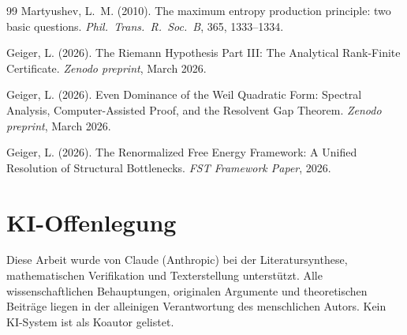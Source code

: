 \documentclass[12pt,a4paper]{article}
\theoremstyle{remark}
\begin{document}
\begin{thebibliography}{99}
Martyushev, L.~M. (2010).
\newblock The maximum entropy production principle: two basic questions.
\newblock \textit{Phil.\ Trans.\ R.\ Soc.\ B}, 365, 1333--1334.

Geiger, L. (2026).
\newblock The Riemann Hypothesis Part III: The Analytical Rank-Finite Certificate.
\newblock \textit{Zenodo preprint}, March 2026.

Geiger, L. (2026).
\newblock Even Dominance of the Weil Quadratic Form: Spectral Analysis, Computer-Assisted Proof, and the Resolvent Gap Theorem.
\newblock \textit{Zenodo preprint}, March 2026.

Geiger, L. (2026).
\newblock The Renormalized Free Energy Framework: A Unified Resolution of Structural Bottlenecks.
\newblock \textit{FST Framework Paper}, 2026.

\end{thebibliography}

\section*{KI-Offenlegung}
Diese Arbeit wurde von Claude (Anthropic) bei der Literatursynthese, mathematischen Verifikation und Texterstellung unterst\"utzt. Alle wissenschaftlichen Behauptungen, originalen Argumente und theoretischen Beitr\"age liegen in der alleinigen Verantwortung des menschlichen Autors. Kein KI-System ist als Koautor gelistet.
\end{document}
